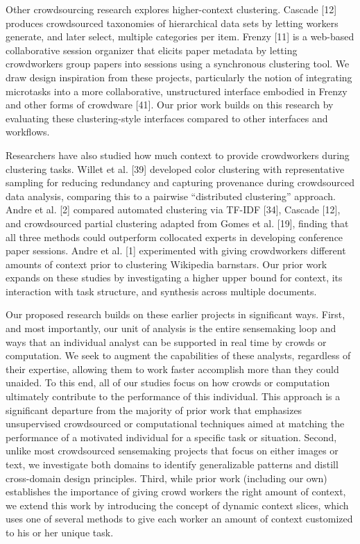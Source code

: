 \documentclass[journal]{vgtc}                %
\begin{document}
Other crowdsourcing research explores higher-context clustering. Cascade [12] produces crowdsourced taxonomies of hierarchical data sets by letting workers generate, and later select, multiple categories per item. Frenzy [11] is a web-based collaborative session organizer that elicits paper metadata by letting crowdworkers group papers into sessions using a synchronous clustering tool. We draw design inspiration from these projects, particularly the notion of integrating microtasks into a more collaborative, unstructured interface embodied in Frenzy and other forms of crowdware [41]. Our prior work builds on this research by evaluating these clustering-style interfaces compared to other interfaces and workflows.

Researchers have also studied how much context to provide crowdworkers during clustering tasks. Willet et al. [39] developed color clustering with representative sampling for reducing redundancy and capturing provenance during crowdsourced data analysis, comparing this to a pairwise “distributed clustering” approach. Andre et al. [2] compared automated clustering via TF-IDF [34], Cascade [12], and crowdsourced partial clustering adapted from Gomes et al. [19], finding that all three methods could outperform collocated experts in developing conference paper sessions. Andre et al. [1] experimented with giving crowdworkers different amounts of context prior to clustering Wikipedia barnstars. Our prior work expands on these studies by investigating a higher upper bound for context, its interaction with task structure, and synthesis across multiple documents.

Our proposed research builds on these earlier projects in significant ways. First, and most importantly, our unit of analysis is the entire sensemaking loop and ways that an individual analyst can be supported in real time by crowds or computation. We seek to augment the capabilities of these analysts, regardless of their expertise, allowing them to work faster accomplish more than they could unaided. To this end, all of our studies focus on how crowds or computation ultimately contribute to the performance of this individual. This approach is a significant departure from the majority of prior work that emphasizes unsupervised crowdsourced or computational techniques aimed at matching the performance of a motivated individual for a specific task or situation. Second, unlike most crowdsourced sensemaking projects that focus on either images or text, we investigate both domains to identify generalizable patterns and distill cross-domain design principles. Third, while prior work (including our own) establishes the importance of giving crowd workers the right amount of context, we extend this work by introducing the concept of dynamic context slices, which uses one of several methods to give each worker an amount of context customized to his or her unique task.
\end{document}
